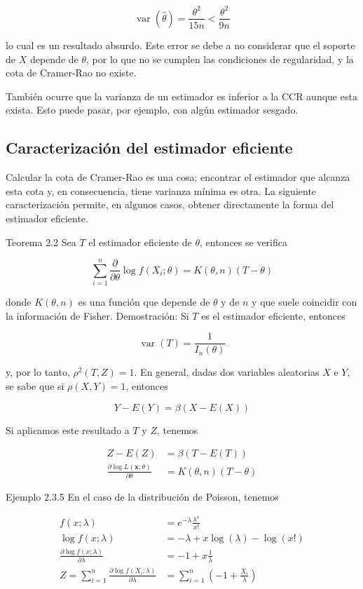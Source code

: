 \documentclass[
]{article}
\begin{document}
\[
\operatorname{var}(\widehat{\theta})=\frac{\theta^{2}}{15 n}<\frac{\theta^{2}}{9 n}
\]

lo cual es un resultado absurdo. Este error se debe a no considerar que el soporte de \(X\) depende de \(\theta\), por lo que no se cumplen las condiciones de regularidad, y la cota de Cramer-Rao no existe.

También ocurre que la varianza de un estimador es inferior a la CCR aunque esta exista. Esto puede pasar, por ejemplo, con algún estimador sesgado.

\subsection{Caracterización del estimador eficiente}\label{caracterizaciuxf3n-del-estimador-eficiente}

Calcular la cota de Cramer-Rao es una cosa; encontrar el estimador que alcanza esta cota y, en consecuencia, tiene varianza mínima es otra. La siguiente caracterización permite, en algunos casos, obtener directamente la forma del estimador eficiente.

Teorema 2.2 Sea \(T\) el estimador eficiente de \(\theta\), entonces se verifica

\[
\sum_{i=1}^{n} \frac{\partial}{\partial \theta} \log f\left(X_{i} ; \theta\right)=K(\theta, n)(T-\theta)
\]

donde \(K(\theta, n)\) es una función que depende de \(\theta\) y de \(n\) y que suele coincidir con la información de Fisher.
Demostración:
Si \(T\) es el estimador eficiente, entonces

\[
\operatorname{var}(T)=\frac{1}{I_{n}(\theta)}
\]

y, por lo tanto, \(\rho^{2}(T, Z)=1\).
En general, dadas dos variables aleatorias \(X\) e \(Y\), se sabe que si \(\rho(X, Y)=1\), entonces

\[
Y-E(Y)=\beta(X-E(X))
\]

Si aplicamos este resultado a \(T\) y \(Z\), tenemos

\[
\begin{aligned}
Z-E(Z) & =\beta(T-E(T)) \\
\frac{\partial \log L(\mathbf{x} ; \theta)}{\partial \theta} & =K(\theta, n)(T-\theta)
\end{aligned}
\]

Ejemplo 2.3.5 En el caso de la distribución de Poisson, tenemos

\[
\begin{aligned}
f(x ; \lambda) & =e^{-\lambda} \frac{\lambda^{x}}{x!} \\
\log f(x ; \lambda) & =-\lambda+x \log (\lambda)-\log (x!) \\
\frac{\partial \log f(x ; \lambda)}{\partial \lambda} & =-1+x \frac{1}{\lambda} \\
Z=\sum_{i=1}^{n} \frac{\partial \log f\left(X_{i} ; \lambda\right)}{\partial \lambda} & =\sum_{i=1}^{n}\left(-1+\frac{X_{i}}{\lambda}\right)
\end{aligned}
\]
\end{document}
